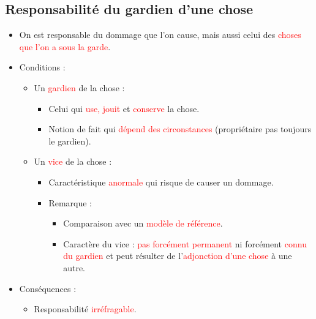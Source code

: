 \subsection{Responsabilité du gardien d'une chose}
\begin{itemize}
	\item On est responsable du dommage que l'on cause, mais aussi celui des \textcolor{red}{choses que l'on a sous la garde}.
	\item Conditions :
	\begin{itemize}
		\item Un \textcolor{red}{gardien} de la chose :
		\begin{itemize}
			\item Celui qui \textcolor{red}{use, jouit} et \textcolor{red}{conserve} la chose.
			\item Notion de fait qui \textcolor{red}{dépend des circonstances} (propriétaire pas toujours le gardien).
		\end{itemize}
		\item Un \textcolor{red}{vice} de la chose :
		\begin{itemize}
			\item Caractéristique \textcolor{red}{anormale} qui risque de causer un dommage.
			\item Remarque : 
			\begin{itemize}
				\item Comparaison avec un \textcolor{red}{modèle de référence}.
				\item Caractère du vice : \textcolor{red}{pas forcément permanent} ni forcément \textcolor{red}{connu du gardien} et peut résulter de l'\textcolor{red}{adjonction d'une chose} à une autre.
			\end{itemize}
		\end{itemize}
	\end{itemize}
	\item Conséquences :
	\begin{itemize}
		\item Responsabilité \textcolor{red}{irréfragable}.
	\end{itemize}
\end{itemize}

